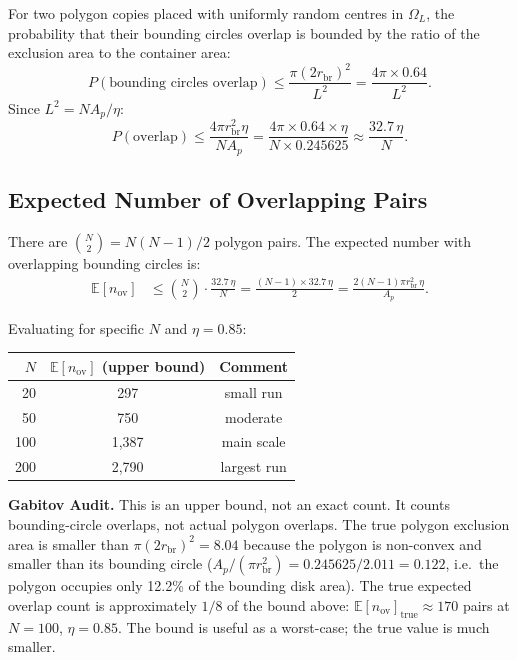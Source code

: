 \documentclass[11pt,oneside]{article}
\newcommand{\gabitov}[1]{\begin{gabitovbox}\textbf{Gabitov Audit.} #1\end{gabitovbox}}
\begin{document}
For two polygon copies placed with uniformly random centres in
$\Omega_L$, the probability that their bounding circles overlap is
bounded by the ratio of the exclusion area to the container area:
\[
  P(\text{bounding circles overlap})
  \leq \frac{\pi (2 r_{\mathrm{br}})^2}{L^2}
  = \frac{4\pi \times 0.64}{L^2}.
\]
Since $L^2 = N A_p / \eta$:
\begin{equation}
  P(\text{overlap}) \leq
  \frac{4\pi r_{\mathrm{br}}^2 \eta}{N A_p}
  = \frac{4\pi \times 0.64 \times \eta}{N \times 0.245625}
  \approx \frac{32.7\,\eta}{N}.
  \label{eq:poverlap}
\end{equation}

\subsection{Expected Number of Overlapping Pairs}

There are $\binom{N}{2} = N(N-1)/2$ polygon pairs. The expected number
with overlapping bounding circles is:
\begin{align}
  \mathbb{E}[n_{\mathrm{ov}}]
  &\leq \binom{N}{2} \cdot \frac{32.7\,\eta}{N}
  = \frac{(N-1) \times 32.7\,\eta}{2}
  = \frac{2(N-1)\pi r_{\mathrm{br}}^2\,\eta}{A_p}.
  \label{eq:Eov}
\end{align}

Evaluating for specific $N$ and $\eta = 0.85$:
\begin{center}
\begin{tabular}{rcc}
\toprule
$N$ & $\mathbb{E}[n_{\mathrm{ov}}]$ (upper bound) & Comment \\
\midrule
 20 &  297 & small run \\
 50 &  750 & moderate \\
100 & 1{,}387 & main scale \\
200 & 2{,}790 & largest run \\
\bottomrule
\end{tabular}
\end{center}

\gabitov{%
This is an upper bound, not an exact count. It counts bounding-circle
overlaps, not actual polygon overlaps. The true polygon exclusion area
is smaller than $\pi(2r_{\mathrm{br}})^2 = 8.04$ because the polygon
is non-convex and smaller than its bounding circle
($A_p / (\pi r_{\mathrm{br}}^2) = 0.245625 / 2.011 = 0.122$, i.e.\ the
polygon occupies only 12.2\% of the bounding disk area). The true
expected overlap count is approximately $1/8$ of the bound above:
$\mathbb{E}[n_{\mathrm{ov}}]_{\mathrm{true}} \approx 170$ pairs at
$N=100$, $\eta=0.85$. The bound is useful as a worst-case; the true
value is much smaller.%
}
\end{document}
